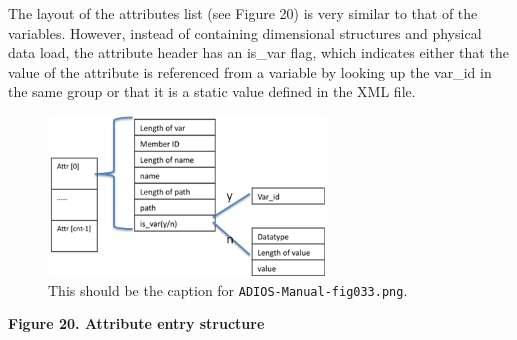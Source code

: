 \vspace{10pt}
The layout of the attributes list (see Figure 20) is very similar to that of the 
variables. However, instead of containing dimensional structures and physical data 
load, the attribute header has an is\_var flag, which indicates either that the 
value of the attribute is referenced from a variable by looking up the var\_id 
in the same group or that it is a static value defined in the XML file. 

\begin{figure}[htbp]
\begin{center}
\includegraphics[width=210pt, height=120pt]{ADIOS-Manual-fig033.png}
\caption{This should be the caption for \texttt{ADIOS-Manual-fig033.png}.}
\end{center}
\end{figure}\label{HRef119579105}\label{HToc144350179}

\vspace{34pt}
\begin{center}
{\color{color20} \textbf{Figure 20. Attribute entry structure\label{HToc84890278}\label{HToc212016654}\label{HToc212016896}\label{HToc182553425}}}
\end{center}

